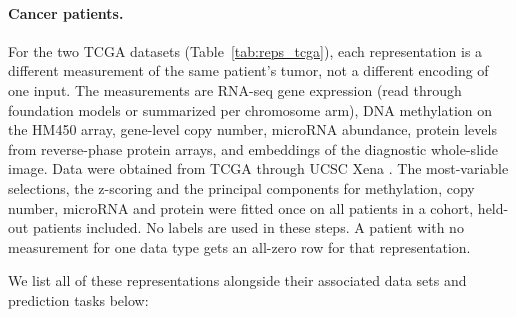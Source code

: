 \paragraph{Cancer patients.} For the two TCGA datasets (Table~\ref{tab:reps_tcga}), each representation is a different measurement of the same patient's tumor, not a different encoding of one input. The measurements are RNA-seq gene expression (read through foundation models or summarized per chromosome arm), DNA methylation on the HM450 array, gene-level copy number, microRNA abundance, protein levels from reverse-phase protein arrays, and embeddings of the diagnostic whole-slide image. Data were obtained from TCGA through UCSC Xena \citep{TCGA2013, Goldman2020}. The most-variable selections, the z-scoring and the principal components for methylation, copy number, microRNA and protein were fitted once on all patients in a cohort, held-out patients included. No labels are used in these steps. A patient with no measurement for one data type gets an all-zero row for that representation.

We list all of these representations alongside their associated data sets and prediction tasks below:

